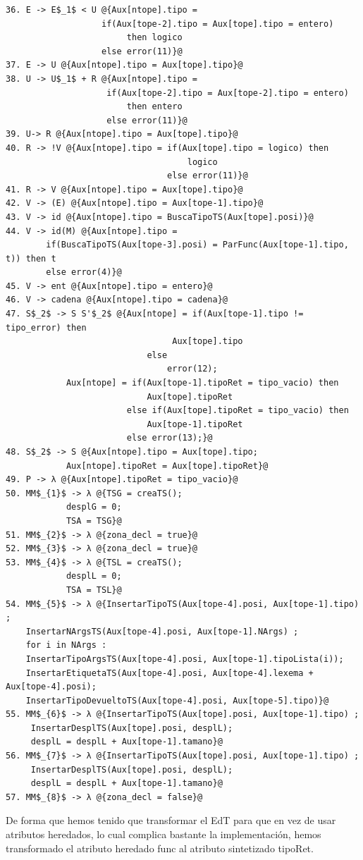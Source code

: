 \begin{lstlisting}[style=EdT]
36. E -> E$_1$ < U @{Aux[ntope].tipo =
                   if(Aux[tope-2].tipo = Aux[tope].tipo = entero)
                        then logico
                   else error(11)}@
37. E -> U @{Aux[ntope].tipo = Aux[tope].tipo}@
38. U -> U$_1$ + R @{Aux[ntope].tipo = 
					if(Aux[tope-2].tipo = Aux[tope-2].tipo = entero)
						then entero 
					else error(11)}@
39. U-> R @{Aux[ntope].tipo = Aux[tope].tipo}@
40. R -> !V @{Aux[ntope].tipo = if(Aux[tope].tipo = logico) then 
									logico
             					else error(11)}@
41. R -> V @{Aux[ntope].tipo = Aux[tope].tipo}@
42. V -> (E) @{Aux[ntope].tipo = Aux[tope-1].tipo}@
43. V -> id @{Aux[ntope].tipo = BuscaTipoTS(Aux[tope].posi)}@
44. V -> id(M) @{Aux[ntope].tipo = 
		if(BuscaTipoTS(Aux[tope-3].posi) = ParFunc(Aux[tope-1].tipo, t)) then t
		else error(4)}@
45. V -> ent @{Aux[ntope].tipo = entero}@
46. V -> cadena @{Aux[ntope].tipo = cadena}@
47. S$_2$ -> S S'$_2$ @{Aux[ntope] = if(Aux[tope-1].tipo != tipo_error) then
								 Aux[tope].tipo
							else 
								error(12);
			Aux[ntope] = if(Aux[tope-1].tipoRet = tipo_vacio) then 
							Aux[tope].tipoRet
						else if(Aux[tope].tipoRet = tipo_vacio) then 
							Aux[tope-1].tipoRet 
						else error(13);}@
48. S$_2$ -> S @{Aux[ntope].tipo = Aux[tope].tipo;
			Aux[ntope].tipoRet = Aux[tope].tipoRet}@
49. P -> λ @{Aux[ntope].tipoRet = tipo_vacio}@
50. MM$_{1}$ -> λ @{TSG = creaTS();
			desplG = 0;
			TSA = TSG}@
51. MM$_{2}$ -> λ @{zona_decl = true}@
52. MM$_{3}$ -> λ @{zona_decl = true}@
53. MM$_{4}$ -> λ @{TSL = creaTS();
			desplL = 0;
			TSA = TSL}@
54. MM$_{5}$ -> λ @{InsertarTipoTS(Aux[tope-4].posi, Aux[tope-1].tipo) ;
	InsertarNArgsTS(Aux[tope-4].posi, Aux[tope-1].NArgs) ;
	for i in NArgs :
	InsertarTipoArgsTS(Aux[tope-4].posi, Aux[tope-1].tipoLista(i));
	InsertarEtiquetaTS(Aux[tope-4].posi, Aux[tope-4].lexema + Aux[tope-4].posi); 
	InsertarTipoDevueltoTS(Aux[tope-4].posi, Aux[tope-5].tipo)}@
55. MM$_{6}$ -> λ @{InsertarTipoTS(Aux[tope].posi, Aux[tope-1].tipo) ;
     InsertarDesplTS(Aux[tope].posi, desplL);
     desplL = desplL + Aux[tope-1].tamano}@
56. MM$_{7}$ -> λ @{InsertarTipoTS(Aux[tope].posi, Aux[tope-1].tipo) ;
     InsertarDesplTS(Aux[tope].posi, desplL);
     desplL = desplL + Aux[tope-1].tamano}@
57. MM$_{8}$ -> λ @{zona_decl = false}@
\end{lstlisting}
\newpage
De forma que hemos tenido que transformar el EdT para que en vez de usar atributos heredados, lo cual complica bastante la implementación, hemos transformado el atributo heredado func al atributo sintetizado tipoRet.

